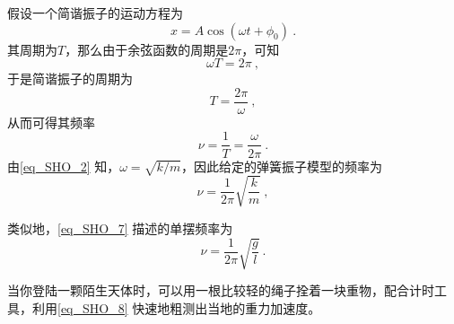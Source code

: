 假设一个简谐振子的运动方程为
\begin{equation}
x = A\cos(\omega t+\phi_0)~.
\end{equation}
其周期为$T$，那么由于余弦函数的周期是$2\pi$，可知
\begin{equation}
\omega T = 2\pi~,
\end{equation}
于是简谐振子的周期为
\begin{equation}\label{eq_SHO_9}
T = \frac{2\pi}{\omega}~,
\end{equation}
从而可得其频率
\begin{equation}
\nu = \frac{1}{T} = \frac{\omega}{2\pi}~.
\end{equation}
由\autoref{eq_SHO_2} 知，$\omega=\sqrt{k/m}$，因此给定的弹簧振子模型的频率为
\begin{equation}
\nu = \frac{1}{2\pi}\sqrt{\frac{k}{m}}~,
\end{equation}

类似地，\autoref{eq_SHO_7} 描述的单摆频率为
\begin{equation}\label{eq_SHO_8}
\nu = \frac{1}{2\pi}\sqrt{\frac{g}{l}}~.
\end{equation}

当你登陆一颗陌生天体时，可以用一根比较轻的绳子拴着一块重物，配合计时工具，利用\autoref{eq_SHO_8} 快速地粗测出当地的重力加速度。












